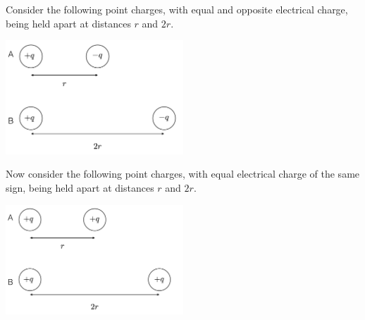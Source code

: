 \documentclass[12pt]{exam}
\begin{document}
\begin{questions}
\vspace{0.3in}
\clearpage
\question
Consider the following point charges, with equal and opposite electrical charge, being held apart at distances $r$ and $2r$.
\begin{center}
\includegraphics[width=0.5\textwidth]{../images/coop9_chargeopp.png}
\end{center}

\question Now consider the following point charges, with equal electrical charge of the same sign, being held apart at distances $r$ and $2r$.
\begin{center}
\includegraphics[width=0.5\textwidth]{../images/coop9_chargesame.png}
\end{center}
\begin{parts}

\end{parts}
\end{questions}
\end{document}
